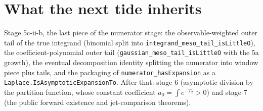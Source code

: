\documentclass[11pt]{article}
\newcommand{\code}[1]{\texttt{#1}}
\begin{document}
\section{What the next tide inherits}

Stage 5c-ii-b, the last piece of the numerator stage: the
observable-weighted outer tail of the true integrand
(binomial split into \code{integrand\_meso\_tail\_isLittleO}), the
coefficient-polynomial outer tail
(\code{gaussian\_meso\_tail\_isLittleO} with the 5a growth), the
eventual decomposition identity splitting the numerator into window
piece plus tails, and the packaging of
\code{numerator\_hasExpansion} as a
\code{Laplace.IsAsymptoticExpansionTo}. After that: stage 6
(asymptotic division by the partition function, whose constant
coefficient $a_0 = \int e^{-T_2} > 0$) and stage 7 (the public
forward existence and jet-comparison theorems).
\end{document}
